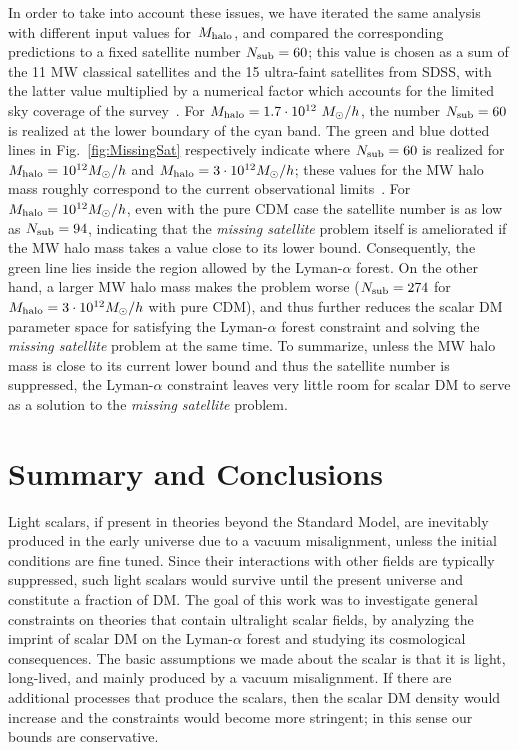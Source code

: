\documentclass[11pt,nofootinbib]{article}
\numberwithin{equation}{section}
\begin{document}
In order to take into account these issues, we have iterated the same
analysis with different input values for~$M_{\rm
halo}$,
and compared the corresponding predictions to a fixed satellite number 
$N_{\rm sub} = 60$;
this value is chosen as a sum of the 
11 MW classical satellites and the 15 ultra-faint satellites from SDSS, 
with the latter value multiplied by a numerical factor which accounts
for the limited sky coverage of the
survey~\cite{Murgia:2017lwo,Schneider:2016uqi,Polisensky:2010rw}.
For $M_{\rm halo} = 1.7 \cdot 10^{12}~M_\odot/h$,
the number
$N_{\rm sub} = 60$ is realized at the lower boundary of the cyan band. 
The green and blue dotted lines in Fig.~\ref{fig:MissingSat}
respectively indicate where $N_{\rm sub} = 60$ is realized for $M_{\rm
halo} = 10^{12} M_{\odot} / h$ and $M_{\rm halo} = 3 \cdot 10^{12}
M_{\odot} / h$;
these values for the MW halo mass roughly correspond to the current
observational limits~\cite{Cautun:2014dda,Wang:2015ala}.
For $M_{\rm halo} = 10^{12} M_{\odot} / h$, even with the pure CDM case the
satellite number is as low as $N_{\rm sub} = 94$, indicating that
the {\emph{missing satellite}} problem
itself is ameliorated if the MW halo mass takes a value close to its lower bound.
Consequently, the green line lies inside the region allowed by the
Lyman-$\alpha$ forest.
On the other hand, a larger MW halo mass makes the problem worse
($N_{\rm sub} = 274$ for 
$M_{\rm halo} = 3 \cdot 10^{12} M_{\odot} / h$ with pure CDM),
and thus further reduces the scalar DM parameter space for
satisfying the Lyman-$\alpha$ forest constraint 
and solving the {\emph{missing satellite}} problem at the same time.
To summarize,
unless the MW halo mass is close to its current lower bound and thus the
satellite number is suppressed,
the Lyman-$\alpha$ constraint leaves very little room for scalar DM
to serve as a solution to the {\emph{missing satellite}} problem.



\section{Summary and Conclusions}
\label{sec:conc}

Light scalars, if present in theories beyond the Standard Model, are
inevitably produced in the early universe due to a vacuum misalignment,
unless the initial conditions are fine tuned. Since their
interactions with other fields are typically suppressed, such light scalars
would survive until the present universe
and constitute a fraction of DM.
The goal of this work was to investigate general constraints on theories
that contain ultralight scalar fields, by analyzing the imprint of scalar DM
on the Lyman-$\alpha$ forest and studying its cosmological consequences.
The basic assumptions we made about the scalar is that it is
light, long-lived, and mainly produced by a vacuum misalignment.
If there are additional processes that produce the scalars, then the
scalar DM density would increase and the constraints would become more
stringent; in this sense our bounds are conservative.
\end{document}
